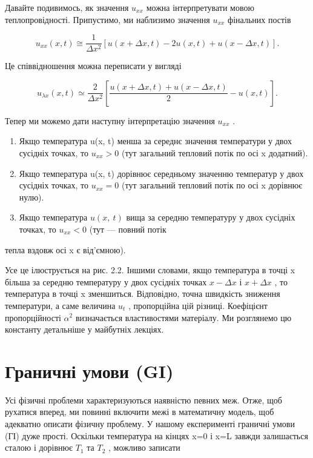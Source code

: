 \documentclass[
  ukrainian,
]{article}
\begin{document}
Давайте подивимось, як значення \(u_{xx}\) можна інтерпретувати мовою
теплопровідності. Припустимо, ми наблизимо значення \(u_{xx}\) фінальних
постів

\[
u_{xx}(x, t) \cong \frac{1}{\Delta x^2} [u(x + \Delta x, t) - 2u(x, t) + u(x - \Delta x, t)].
\]

Це співвідношення можна переписати у вигляді

\[
u_{\lambda x}(x, t) \simeq \frac{2}{\Delta x^2} \left[ \frac{u(x + \Delta x, t) + u(x - \Delta x, t)}{2} - u(x, t) \right].
\]

Тепер ми можемо дати наступну інтерпретацію значення \(u_{xx}\) .

\begin{enumerate}
\def\labelenumi{\arabic{enumi}.}
\item
  Якщо температура u(x, t) менша за середнє значення температури у двох
  сусідніх точках, то \(u_{xx} > 0\) (тут загальний тепловий потік по
  осі x додатний).
\item
  Якщо температура u(x, t) дорівнює середньому значенню температур у
  двох сусідніх точках, то \(u_{xx} = 0\) (тут загальний тепловий потік
  по осі x дорівнює нулю).
\item
  Якщо температура \(u\left(x,\ t\right)\) вища за середню температуру у
  двох сусідніх точках, то \(u_{xx}<0\) (тут --- повний потік
\end{enumerate}

тепла вздовж осі x є від'ємною).

Усе це ілюструється на рис. 2.2. Іншими словами, якщо температура в
точці x більша за середню температуру у двох сусідніх точках
\(x - \Delta x\) і \(x + \Delta x\) , то температура в точці x
зменшиться. Відповідно, точна швидкість зниження температури, а саме
величина \(u_t\) , пропорційна цій різниці. Коефіцієнт пропорційності
\(\alpha^2\) визначається властивостями матеріалу. Ми розглянемо цю
константу детальніше у майбутніх лекціях.

\section{Граничні умови
(GI)}\label{ux433ux440ux430ux43dux438ux447ux43dux456-ux443ux43cux43eux432ux438-gi}

Усі фізичні проблеми характеризуються наявністю певних меж. Отже, щоб
рухатися вперед, ми повинні включити межі в математичну модель, щоб
адекватно описати фізичну проблему. У нашому експерименті граничні умови
(ГІ) дуже прості. Оскільки температура на кінцях x=0 і x=L завжди
залишається сталою і дорівнює \(T_1\) та \(T_2\) , можливо записати
\end{document}
